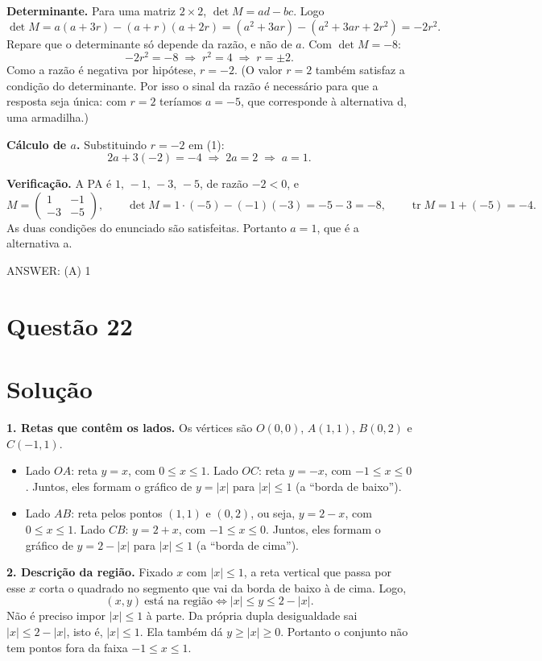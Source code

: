 \documentclass{article}%
\begin{document}
\textbf{Determinante.} Para uma matriz $2\times 2$, $\det M=ad-bc$. Logo
\[
\det M=a(a+3r)-(a+r)(a+2r)=(a^2+3ar)-(a^2+3ar+2r^2)=-2r^2 .
\]
Repare que o determinante só depende da razão, e não de $a$. Com $\det M=-8$:
\[
-2r^2=-8\;\Longrightarrow\; r^2=4\;\Longrightarrow\; r=\pm 2 .
\]
Como a razão é negativa por hipótese, $r=-2$. (O valor $r=2$ também satisfaz a condição do determinante. Por isso o sinal da razão é necessário para que a resposta seja única: com $r=2$ teríamos $a=-5$, que corresponde à alternativa d, uma armadilha.)

\textbf{Cálculo de $a$.} Substituindo $r=-2$ em (1):
\[
2a+3(-2)=-4\;\Longrightarrow\; 2a=2\;\Longrightarrow\; a=1 .
\]

\textbf{Verificação.} A PA é $1,\,-1,\,-3,\,-5$, de razão $-2<0$, e
\[
M=\begin{pmatrix} 1 & -1\\ -3 & -5\end{pmatrix},\qquad
\det M=1\cdot(-5)-(-1)(-3)=-5-3=-8,\qquad
\operatorname{tr}M=1+(-5)=-4 .
\]
As duas condições do enunciado são satisfeitas. Portanto $a=1$, que é a alternativa a.

ANSWER: (A) 1%
\newpage%
\section*{Questão 22}

\section*{Solução}

\textbf{1. Retas que contêm os lados.} Os vértices são $O(0,0)$, $A(1,1)$, $B(0,2)$ e $C(-1,1)$.
\begin{itemize}
\item Lado $OA$: reta $y=x$, com $0\le x\le 1$. Lado $OC$: reta $y=-x$, com $-1\le x\le 0$. Juntos, eles formam o gráfico de $y=|x|$ para $|x|\le 1$ (a ``borda de baixo'').
\item Lado $AB$: reta pelos pontos $(1,1)$ e $(0,2)$, ou seja, $y=2-x$, com $0\le x\le 1$. Lado $CB$: $y=2+x$, com $-1\le x\le 0$. Juntos, eles formam o gráfico de $y=2-|x|$ para $|x|\le 1$ (a ``borda de cima'').
\end{itemize}

\textbf{2. Descrição da região.} Fixado $x$ com $|x|\le 1$, a reta vertical que passa por esse $x$ corta o quadrado no segmento que vai da borda de baixo à de cima. Logo,
\[
(x,y)\ \text{está na região} \iff |x|\le y\le 2-|x| .
\]
Não é preciso impor $|x|\le 1$ à parte. Da própria dupla desigualdade sai $|x|\le 2-|x|$, isto é, $|x|\le 1$. Ela também dá $y\ge |x|\ge 0$. Portanto o conjunto não tem pontos fora da faixa $-1\le x\le 1$.
\end{document}
